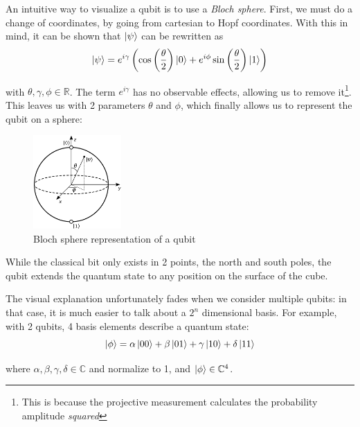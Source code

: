 \documentclass[12pt]{memoir}
\newcommand{\ti}{\textit}
\begin{document}
An intuitive way to visualize a qubit is to use a \ti{Bloch sphere}. First, we must do a change of coordinates, by going from cartesian to Hopf coordinates. With this in mind, it can be shown that $\ket \psi$ can be rewritten as
\begin{equation}
    \ket \psi = e^{i\gamma}\left( \cos\left(\frac{\theta}{2}\right)\ket 0 + e^{i\phi} \sin\left(\frac{\theta}{2}\right)\ket 1\right)
\end{equation}

with $\theta,\gamma,\phi \in \mathbb{R}$. The term $e^{i\gamma}$ has no observable effects, allowing us to remove it\footnote{This is because the projective measurement calculates the probability amplitude \textit{squared}}. This leaves us with 2 parameters $\theta$ and $\phi$, which finally allows us to represent the qubit on a sphere:


\begin{figure}[H]

    \centering

    \includegraphics[width=0.3\textwidth]{figures/bloch_sphere.png}

    \caption{Bloch sphere representation of a qubit \cite{wiki:qubit}}

    \label{fig:bloch-sphere}

\end{figure}

While the classical bit only exists in 2 points, the north and south poles, the qubit extends the quantum state to any position on the surface of the cube. \cite{wiki:qubit,book:Nielsen-Chuang-2010}\medbreak


The visual explanation unfortunately fades when we consider multiple qubits: in that case, it is much easier to talk about a $2^n$ dimensional basis. For example, with 2 qubits, 4 basis elements describe a quantum state:
\begin{equation}
    \ket{\phi} = \alpha \ket{00} + \beta \ket{01} + \gamma \ket{10} + \delta \ket{11}
\end{equation}


where $\alpha,\beta,\gamma,\delta \in \mathbb C$ and normalize to 1, and $\ket{\phi} \in \mathbb{C}^4$.\medbreak
\end{document}
